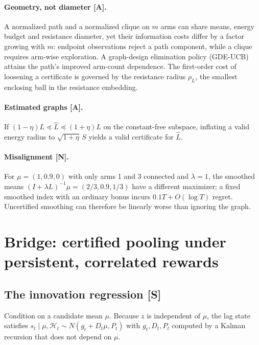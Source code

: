 \documentclass[11pt]{article}
\theoremstyle{definition}
\theoremstyle{remark}
\newcommand{\src}[1]{\textsf{[#1]}}
\begin{document}
\paragraph{Geometry, not diameter \src{A}.} A normalized path and a normalized clique on $m$ arms can share means, energy budget and resistance diameter, yet their information costs differ by a factor growing with $m$: endpoint observations reject a path component, while a clique requires arm-wise exploration. A graph-design elimination policy (GDE-UCB) attains the path's improved arm-count dependence. The first-order cost of loosening a certificate is governed by the resistance radius $\rho_L$, the smallest enclosing ball in the resistance embedding.

\paragraph{Estimated graphs \src{A}.} If $(1-\eta)L\preceq\hat L\preceq(1+\eta)L$ on the constant-free subspace, inflating a valid energy radius to $\sqrt{1+\eta}\,S$ yields a valid certificate for $\hat L$.

\paragraph{Misalignment \src{N}.} For $\mu=(1,0.9,0)$ with only arms 1 and 3 connected and $\lambda=1$, the smoothed means $(I+\lambda L)^{-1}\mu=(2/3,0.9,1/3)$ have a different maximizer; a fixed smoothed index with an ordinary bonus incurs $0.1T+O(\log T)$ regret. Uncertified smoothing can therefore be linearly worse than ignoring the graph.

\section{Bridge: certified pooling under persistent, correlated rewards}\label{sec:bridge}

\subsection{The innovation regression \src{S}}

Condition on a candidate mean $\mu$. Because $z$ is independent of $\mu$, the lag state satisfies $s_t\mid\mu,\mathcal H_t\sim N(g_t+D_t\mu,P_t)$ with $g_t,D_t,P_t$ computed by a Kalman recursion that does not depend on $\mu$.
\end{document}
